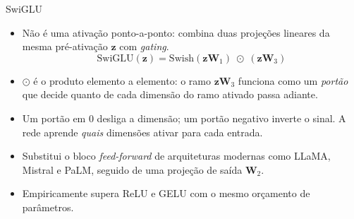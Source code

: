 \documentclass[aspectratio=169,xcolor=dvipsnames]{beamer}
\begin{document}
  \begin{frame}{SwiGLU}
    \begin{itemize}
      \item Não é uma ativação ponto-a-ponto: combina duas projeções lineares da mesma pré-ativação $\mathbf{z}$
        com \textit{gating}.
      \[
        \mathrm{SwiGLU}(\mathbf{z})
          = \mathrm{Swish}(\mathbf{z}\mathbf{W}_1)\;\odot\;(\mathbf{z}\mathbf{W}_3)
      \]
      \item $\odot$ é o produto elemento a elemento: o ramo $\mathbf{z}\mathbf{W}_3$ funciona como
        um \textit{portão} que decide quanto de cada dimensão do ramo ativado passa adiante.
      \item Um portão em $0$ desliga a dimensão; um portão negativo inverte o sinal.
        A rede aprende \textit{quais} dimensões ativar para cada entrada.
      \item Substitui o bloco \textit{feed-forward} de arquiteturas modernas como
        LLaMA, Mistral e PaLM, seguido de uma projeção de saída $\mathbf{W}_2$.
      \item Empiricamente supera ReLU e GELU com o mesmo orçamento de parâmetros.
    \end{itemize}
  \end{frame}
\end{document}
